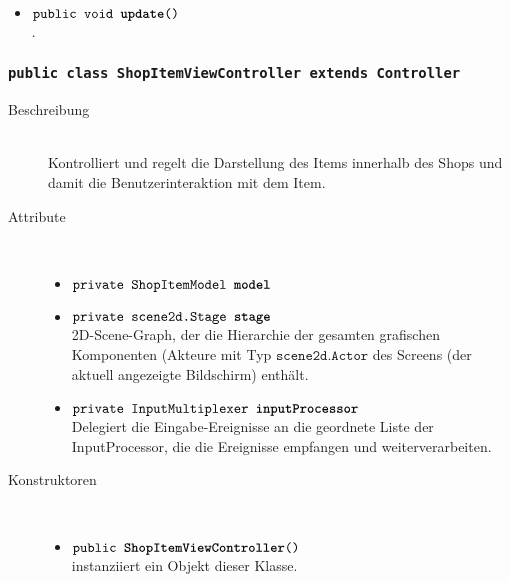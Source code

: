 \begin{description}
\begin{itemize}
		\item $\texttt{public void \textbf{update}()}$ \\.


		\end{itemize}
	\end{description}
	
	
\subsubsection{\normalfont \texttt{public class \textbf{ShopItemViewController} extends Controller}}

\begin{description}
\item[Beschreibung] \hfill \\ Kontrolliert und regelt die Darstellung des Items innerhalb des Shops und damit die Benutzerinteraktion mit dem Item.
\item[Attribute] \hfill \\
	\vspace{-.8cm}
	\begin{itemize}	
		\item $\texttt{private ShopItemModel \textbf{model}}$ \\ 
		\item $\texttt{private scene2d.Stage \textbf{stage}}$ \\ 2D-Scene-Graph, der die Hierarchie der gesamten grafischen Komponenten (Akteure mit Typ $\texttt{scene2d.Actor}$ des Screens (der aktuell angezeigte Bildschirm) enthält. 
		\item $\texttt{private InputMultiplexer \textbf{inputProcessor}}$ \\ Delegiert die Eingabe-Ereignisse an die geordnete Liste der InputProcessor, die die Ereignisse empfangen und weiterverarbeiten.
		\end{itemize}
	
\item[Konstruktoren] \hfill \\
	\vspace{-.8cm}
	\begin{itemize}
		\item $\texttt{public \textbf{ShopItemViewController}()}$ \\ instanziiert ein Objekt dieser Klasse.

	\end{itemize}
	

\end{description}
